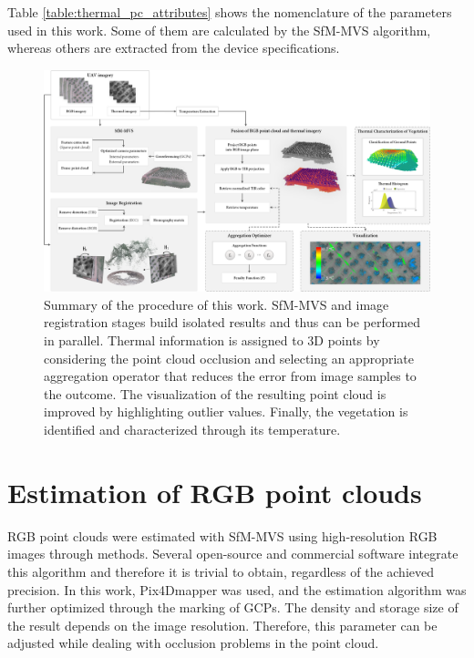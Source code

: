 Table \ref{table:thermal_pc_attributes} shows the nomenclature of the parameters used in this work. Some of them are calculated by the SfM-MVS algorithm, whereas others are extracted from the device specifications.

\begin{figure}
    \centering
    \caption{Summary of the procedure of this work. SfM-MVS and image registration stages build isolated results and thus can be performed in parallel. Thermal information is assigned to 3D points by considering the point cloud occlusion and selecting an appropriate aggregation operator that reduces the error from image samples to the outcome. The visualization of the resulting point cloud is improved by highlighting outlier values. Finally, the vegetation is identified and characterized through its temperature. }
    \label{fig:thermal_projection_overview}
    \includegraphics[width=\linewidth]{figs/thermal_projection/thermal_projection.png}
\end{figure}

\section{Estimation of RGB point clouds}

RGB point clouds were estimated with SfM-MVS using high-resolution RGB images through methods. Several open-source and commercial software integrate this algorithm and therefore it is trivial to obtain, regardless of the achieved precision. In this work, Pix4Dmapper was used, and the estimation algorithm was further optimized through the marking of GCPs. The density and storage size of the result depends on the image resolution. Therefore, this parameter can be adjusted while dealing with occlusion problems in the point cloud.

